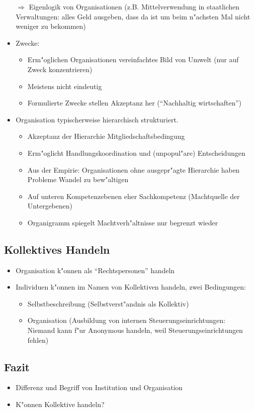 \begin{itemize}
		$\Rightarrow$ Eigenlogik von Organisationen (z.B. Mittelverwendung in staatlichen Verwaltungen: alles Geld ausgeben, dass da ist um beim n"achsten Mal nicht weniger zu bekommen)
	\item
		Zwecke:
		\begin{itemize}
			\item
				Erm"oglichen Organisationen vereinfachtes Bild von Umwelt (nur auf Zweck konzentrieren)
			\item
				Meistens nicht eindeutig
			\item
				Formulierte Zwecke stellen Akzeptanz her (\enquote{Nachhaltig wirtschaften})
		\end{itemize}
	\item
		Organisation typischerweise hierarchisch strukturiert. 
		\begin{itemize}
			\item
				Akzeptanz der Hierarchie Mitgliedschaftsbedingung
			\item
				Erm"oglicht Handlungskoordination und (unpopul"are) Entscheidungen
			\item
				Aus der Empirie: Organisationen ohne ausgepr"agte Hierarchie haben Probleme Wandel zu bew"altigen
			\item
				Auf unteren Kompetenzebenen eher Sachkompetenz (Machtquelle der Untergebenen)
			\item
				Organigramm spiegelt Machtverh"altnisse nur begrenzt wieder
		\end{itemize}

\end{itemize}

\subsection{Kollektives Handeln}
\begin{itemize}
	\item
		Organisation k"onnen als \enquote{Rechtspersonen} handeln
	\item
		Individuen k"onnen im Namen von Kollektiven handeln, zwei Bedingungen:
		\begin{itemize}
			\item
				Selbstbeschreibung (Selbstverst"andnis als Kollektiv)
			\item
				Organisation (Ausbildung von internen Steuerungseinrichtungen: Niemand kann f"ur Anonymous handeln, weil Steuerungseinrichtungen fehlen)
		\end{itemize}
\end{itemize}

\subsection{Fazit}
\begin{itemize}
	\item
		Differenz und Begriff von Institution und Organisation
	\item
		K"onnen Kollektive handeln?
\end{itemize}

